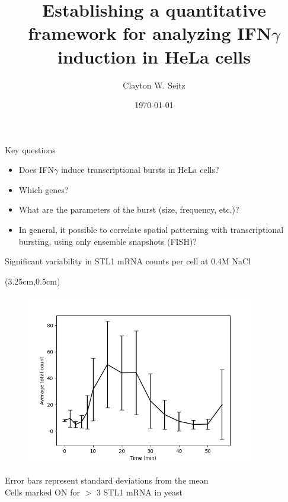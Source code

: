 \documentclass[aspectratio=1610]{beamer}					%
\title{Establishing a quantitative framework for analyzing IFN$\gamma$ induction in HeLa cells}	%
\author{Clayton W. Seitz}								%
\date{\today}									%
\begin{document}
\begin{frame}
  \titlepage
\end{frame}


%

\begin{frame}{Key questions}

\begin{itemize}
\item Does IFN$\gamma$ induce transcriptional bursts in HeLa cells?
\item Which genes?
\item What are the parameters of the burst (size, frequency, etc.)?
\item In general, it possible to correlate spatial patterning with transcriptional bursting, using only ensemble snapshots (FISH)?
\end{itemize}


\end{frame}

\begin{frame}{Significant variability in STL1 mRNA counts per cell at 0.4M NaCl}

\begin{textblock*}{5cm}(3.25cm,0.5cm)
\begin{figure}
\includegraphics[width=10cm]{avg-count.png}
\end{figure}
\end{textblock*}

\vspace{7.25cm}
Error bars represent standard deviations from the mean\\
Cells marked ON for $>$ 3 STL1 mRNA in yeast

\end{frame}
\end{document}
